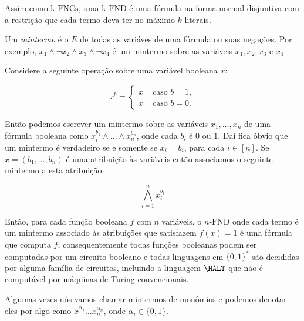 Assim como $\text{k-FNCs}$, uma $\text{k-FND}$ é uma fórmula na forma normal disjuntiva com a restrição que cada termo deva ter no máximo $k$ literais.

\begin{defi}

Um \emph{mintermo} é o $E$ de todas as variáves de uma fórmula ou suas negações. Por exemplo, $x_{1} \land \lnot x_{2} \land x_{3} \land \lnot x_{4}$ é um mintermo sobre as variáveis $x_{1}, x_{2}, x_{3} \text{ e } x_{4}$.

\end{defi}

Considere a seguinte operação sobre uma variável booleana $x$:

\begin{equation*}
    x^{b} =
    \begin{cases}
        x & \text{ caso } b = 1, \\
        \overline{x} & \text{ caso } b = 0.
    \end{cases}
\end{equation*}

Então podemos escrever um mintermo sobre as variáveis $x_{1}, \dots, x_{n}$ de uma fórmula booleana como $x_{i}^{b_{1}} \land \dots \land x_{n}^{b_{n}}$, onde cada $b_{i}$ é $0$ ou $1$. Daí fica óbvio que um mintermo é verdadeiro se e somente se $x_{i} = b_{i}$, para cada $i \in [n]$. Se $x = (b_{1}, \dots, b_{n})$ é uma atribuição às variáveis então associamos o seguinte mintermo a esta atribuição:

\begin{equation*}
\bigwedge_{i = 1}^{n} x_{i}^{b_{i}}
\end{equation*}

Então, para cada função booleana $f$ com $n$ variáveis, o $n\text{-FND}$ onde cada termo é um mintermo associado às atribuições que satisfazem $f(x) = 1$ é uma fórmula que computa $f$, consequentemente todas funções booleanas podem ser computadas por um circuito booleano e todas linguagens em $\{0, 1\}^{*}$ são decididas por alguma família de circuitos, incluindo a linguagem $\HALT$ que não é computável por máquinas de Turing convencionais.

Algumas vezes nós vamos chamar mintermos de monômios e podemos denotar eles por algo como $x_{1}^{\alpha_{1}}\dots x_{n}^{\alpha_{n}}$, onde $\alpha_{i} \in \{0, 1\}$. 
